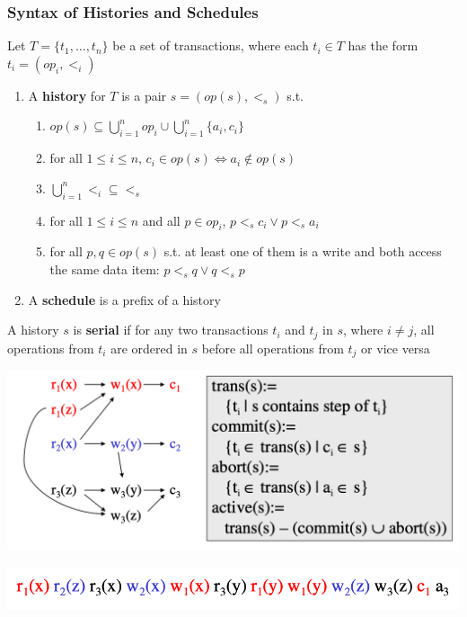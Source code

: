 \documentclass[11pt]{article}
\begin{document}
\subsubsection{Syntax of Histories and Schedules}
\label{sec:org27dc5d9}
\begin{definition}
Let \(T=\{t_1,\dots,t_n\}\) be a set of transactions, where each \(t_i\in T\) has the form
\(t_i=(op_i,<_i)\)
\begin{enumerate}
\item A \textbf{history} for \(T\) is a pair \(s=(op(s),<_s)\) s.t.
\begin{enumerate}
\item \(op(s)\subseteq\bigcup_{i=1}^nop_i\cup\bigcup_{i=1}^n\{a_i,c_i\}\)
\item for all \(1\le i\le n\), \(c_i\in op(s)\Leftrightarrow a_i\notin op(s)\)
\item \(\bigcup_{i=1}^n<_i\subseteq<_s\)
\item for all \(1\le i\le n\) and all \(p\in op_i\), \(p<_sc_i\vee p<_sa_i\)
\item for all \(p,q\in op(s)\) s.t. at least one of them is a write and both access the same
data item: \(p<_sq\vee q<_sp\)
\end{enumerate}
\item A \textbf{schedule} is a prefix of a history
\end{enumerate}
\end{definition}

\begin{definition}[]
A history \(s\) is \textbf{serial} if for any two transactions \(t_i\) and \(t_j\) in \(s\),
where \(i\neq j\), all operations from \(t_i\) are ordered in \(s\) before all operations
from \(t_j\) or vice versa
\end{definition}

\begin{center}
\includegraphics[width=.8\textwidth]{../images/bigdatabase/6.png}
\label{}
\end{center}

\begin{center}
\includegraphics[width=.8\textwidth]{../images/bigdatabase/5.png}
\label{}
\end{center}
\end{document}
